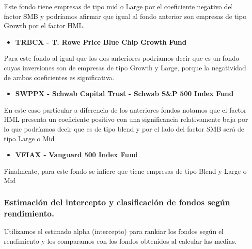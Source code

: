 \documentclass[
  12pt,
]{article}
\newenvironment{Shaded}{\begin{snugshade}}{\end{snugshade}}
\newcommand{\DecValTok}[1]{\textcolor[rgb]{0.00,0.00,0.81}{#1}}
\newcommand{\FunctionTok}[1]{\textcolor[rgb]{0.00,0.00,0.00}{#1}}
\newcommand{\NormalTok}[1]{#1}
\newcommand{\OtherTok}[1]{\textcolor[rgb]{0.56,0.35,0.01}{#1}}
\newcommand{\SpecialCharTok}[1]{\textcolor[rgb]{0.00,0.00,0.00}{#1}}
\providecommand{\tightlist}{%
  \setlength{\itemsep}{0pt}\setlength{\parskip}{0pt}}
\begin{document}
Este fondo tiene empresas de tipo mid o Large por el coeficiente
negativo del factor SMB y podríamos afirmar que igual al fondo anterior
son empresas de tipo Growth por el factor HML.

\begin{itemize}
\tightlist
\item
  \textbf{TRBCX - T. Rowe Price Blue Chip Growth Fund}
\end{itemize}

Para este fondo al igual que los dos anteriores podríamos decir que es
un fondo cuyas inversiones son de empresas de tipo Growth y Large,
porque la negatividad de ambos coeficientes es significativa.

\begin{itemize}
\tightlist
\item
  \textbf{SWPPX - Schwab Capital Trust - Schwab S\&P 500 Index Fund}
\end{itemize}

En este caso particular a diferencia de los anteriores fondos notamos
que el factor HML presenta un coeficiente positivo con una significancia
relativamente baja por lo que podríamos decir que es de tipo blend y por
el lado del factor SMB será de tipo Large o Mid

\begin{itemize}
\tightlist
\item
  \textbf{VFIAX - Vanguard 500 Index Fund}
\end{itemize}

Finalmente, para este fondo se infiere que tiene empresas de tipo Blend
y Large o Mid

\hypertarget{estimaciuxf3n-del-intercepto-y-clasificaciuxf3n-de-fondos-seguxfan-rendimiento.}{%
\subsubsection{Estimación del intercepto y clasificación de fondos según
rendimiento.}\label{estimaciuxf3n-del-intercepto-y-clasificaciuxf3n-de-fondos-seguxfan-rendimiento.}}

Utilizamos el estimado alpha (intercepto) para rankiar los fondos según
el rendimiento y los comparamos con los fondos obtenidos al calcular las
medias.

\begin{Shaded}
\end{Shaded}
\end{document}
